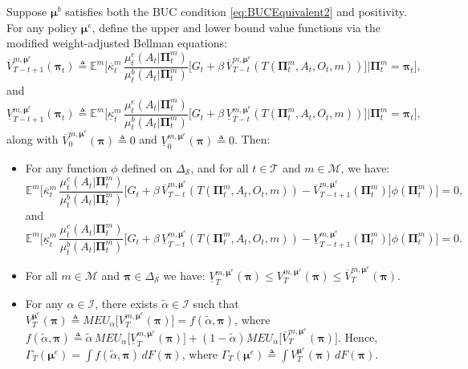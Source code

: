 \documentclass[opre,nonblindrev]{informs2}%
\newcommand{\teq}{\triangleq}
\newcommand{\1}{\hbox{\rm 1\kern-.35em 1}}
\newcommand{\E}{\mathbb E}
\newcommand{\MS}{\mathscr S}
\newcommand{\MT}{\mathscr T}
\newcommand{\MI}{\mathscr I}
\newcommand{\MM}{\mathscr M}
\newcommand{\bpi}{\boldsymbol{\pi}}
\newcommand{\bPi}{\boldsymbol{\Pi}}
\newcommand{\bmu}{\boldsymbol{\mu}}
\newcommand{\un}{\underline}
\newcommand{\ov}{\overline}
\begin{document}
\begin{proposition}\label{prop:POMDPestUBC}
Suppose $\bmu^b$ satisfies both the BUC condition \eqref{eq:BUCEquivalent2} and positivity. For any policy $\bmu^e$, define the upper and lower bound value functions via the modified weight-adjusted Bellman equations:
\begin{equation}\label{eq:POMDPest1BUC}
\ov V_{T-t+1}^{m,\bmu^e} (\bpi_t)\teq \E^m \bigg[\ov \kappa^m_t\,\frac{\mu_t^e(A_t|\bPi^m_t)}{\mu_t^b(A_t|\bPi^m_t)}\Big[G_t+ \beta\, \ov V_{T-t}^{m,\bmu^e}  (T(\bPi^m_t, A_t, O_t, m))\Big]\Big| \bPi^m_t=\bpi_t \bigg],
\end{equation}
and
\begin{equation}\label{eq:POMDPest2BUC}
\un V_{T-t+1}^{m,\bmu^e} (\bpi_t) \teq \E^m \bigg[\un \kappa^m_t\,\frac{\mu_t^e(A_t|\bPi^m_t)}{\mu_t^b(A_t|\bPi^m_t)}\Big[G_t+ \beta\, \un V_{T-t}^{m,\bmu^e}  (T(\bPi^m_t, A_t, O_t, m))\Big]\Big| \bPi^m_t=\bpi_t \bigg],
\end{equation}
along with
$\ov V_{0}^{m,\bmu^e} (\bpi)\teq 0$ and $\un V_{0}^{m,\bmu^e} (\bpi)\teq 0$. Then:
\begin{itemize}[leftmargin=1cm,align=left]
\item[(i)] For any function $\phi$ defined on $\Delta_\MS$, and for all $t\in\MT$ and $m\in \MM$, we have:
\begin{equation} \label{eq:POMDPest3BUC}
\E^m \bigg[\ov \kappa^m_t\, \frac{\mu_t^e(A_t|\bPi^m_t)}{\mu_t^b(A_t|\bPi^m_t)}\Big[G_t+ \beta\,  \ov V_{T-t}^{m,\bmu^e}  (T(\bPi^m_t, A_t, O_t, m))- \ov V_{T-t+1}^{m,\bmu^e} (\bPi^m_t)\Big] \phi (\bPi^m_t)\bigg]=0,
\end{equation}
and
\begin{equation} \label{eq:POMDPest4BUC}
\E^m \bigg[\un \kappa^m_t\, \frac{\mu_t^e(A_t|\bPi^m_t)}{\mu_t^b(A_t|\bPi^m_t)}\Big[G_t+ \beta\,  \un V_{T-t}^{m,\bmu^e}  (T(\bPi^m_t, A_t, O_t, m))- \un V_{T-t+1}^{m,\bmu^e} (\bPi^m_t)\Big] \phi (\bPi^m_t)\bigg]=0.
\end{equation}
\item[(ii)] For all $m\in \MM$ and $\bpi\in\Delta_\MS$ we have:  $ \un V_{T}^{m,\bmu^e} (\bpi) \leq V_{T}^{m,\bmu^e} (\bpi) \leq \ov V_{T}^{m,\bmu^e} (\bpi).$
\item[(iii)]  For any $\alpha\in\MI$, there exists $\tilde\alpha\in\MI$ such that
$V_{T}^{\bmu^e} (\bpi) \teq MEU_\alpha\big[V_{T}^{m,\bmu^e} (\bpi)\big]= f(\tilde\alpha, \bpi)$,
where $f (\tilde\alpha, \bpi)\teq \tilde\alpha\, MEU_\alpha\big[\un V_{T}^{m,\bmu^e} (\bpi)\big]+ (1-\tilde\alpha) MEU_\alpha\big[\ov V_{T}^{m,\bmu^e} (\bpi)\big].$ Hence, $\Gamma_T (\bmu^e)= \int f(\tilde\alpha, \bpi)\,dF(\bpi)$, where $\Gamma_T (\bmu^e)\teq \int V_{T}^{\bmu^e} (\bpi)\,dF(\bpi).$
\end{itemize}
\end{proposition}
\end{document}
